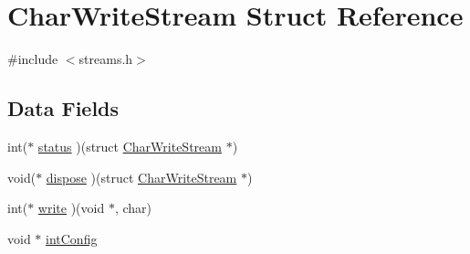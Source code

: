 \hypertarget{structCharWriteStream}{\section{Char\+Write\+Stream Struct Reference}
\label{structCharWriteStream}
}


{\ttfamily \#include $<$streams.\+h$>$}

\subsection*{Data Fields}
\begin{DoxyCompactItemize}
\item 
int($\ast$ \hyperlink{structCharWriteStream_ab867de9b4464d9f6d5c5e49fda78a646}{status} )(struct \hyperlink{structCharWriteStream}{Char\+Write\+Stream} $\ast$)
\item 
void($\ast$ \hyperlink{structCharWriteStream_a9f4aad86a21d5bac116e691cce519953}{dispose} )(struct \hyperlink{structCharWriteStream}{Char\+Write\+Stream} $\ast$)
\item 
int($\ast$ \hyperlink{structCharWriteStream_a5bbd4a45a754eccf80bae5a6f16b215c}{write} )(void $\ast$, char)
\item 
void $\ast$ \hyperlink{structCharWriteStream_acccc8e2084f5a9669fb92a5b4792a9ea}{int\+Config}
\end{DoxyCompactItemize}


